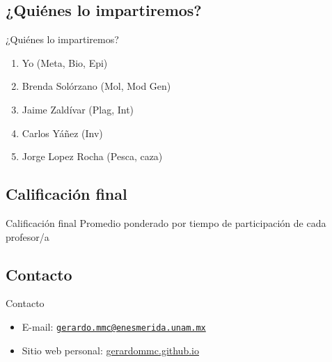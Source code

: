 \documentclass[
  11pt,
  ignorenonframetext,
]{beamer}
\providecommand{\tightlist}{%
  \setlength{\itemsep}{0pt}\setlength{\parskip}{0pt}}
\begin{document}
\hypertarget{quiuxe9nes-lo-impartiremos}{%
\subsection{¿Quiénes lo
impartiremos?}\label{quiuxe9nes-lo-impartiremos}}

\begin{frame}{¿Quiénes lo impartiremos?}
\begin{enumerate}
\item
  Yo (Meta, Bio, Epi)
\item
  Brenda Solórzano (Mol, Mod Gen)
\item
  Jaime Zaldívar (Plag, Int)
\item
  Carlos Yáñez (Inv)
\item
  Jorge Lopez Rocha (Pesca, caza)
\end{enumerate}
\end{frame}

\hypertarget{calificaciuxf3n-final}{%
\subsection{Calificación final}\label{calificaciuxf3n-final}}

\begin{frame}{Calificación final}
Promedio ponderado por tiempo de participación de cada profesor/a
\end{frame}

\hypertarget{contacto}{%
\subsection{Contacto}\label{contacto}}

\begin{frame}{Contacto}
\begin{itemize}
\tightlist
\item
  E-mail:
  \href{mailto:gerardo.mmc@enesmerida.unam.mx}{\nolinkurl{gerardo.mmc@enesmerida.unam.mx}}
\item
  Sitio web personal:
  \href{https://gerardommc.github.com}{gerardommc.github.io}
\end{itemize}
\end{frame}
\end{document}

